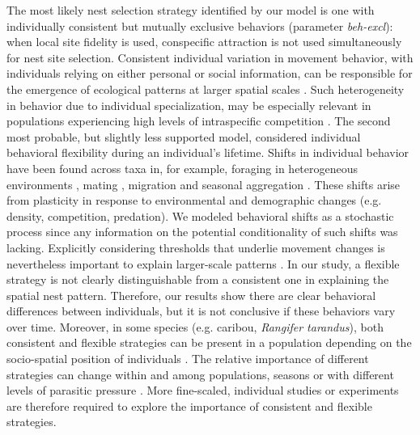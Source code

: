 \documentclass[10pt, twoside]{book} %
\begin{document}
	The most likely nest selection strategy identified by our model is one with individually consistent but mutually exclusive behaviors (parameter \textit{beh-excl}): when local site fidelity is used, conspecific attraction is not used simultaneously for nest site selection. Consistent individual variation in movement behavior, with individuals relying on either personal or social information, can be responsible for the emergence of ecological patterns at larger spatial scales \citep{spiegel2017}. Such heterogeneity in behavior due to individual specialization, may be especially relevant in populations experiencing high levels of intraspecific competition \citep{araujo2011}. The second most probable, but slightly less supported model, considered individual behavioral flexibility during an individual's lifetime. Shifts in individual behavior have been found across taxa in, for example, foraging in heterogeneous environments \citep{newlands2004, webber2020}, mating \citep{perrill1982}, migration \citep{eggeman2016} and seasonal aggregation \citep{bonar2020}. These shifts arise from plasticity in response to environmental and demographic changes (e.g. density, competition, predation). We modeled behavioral shifts as a stochastic process since any information on the potential conditionality of such shifts was lacking. Explicitly considering thresholds that underlie movement changes is nevertheless important to explain larger-scale patterns \citep{morales2002, newlands2004, goossens2020}. In our study, a flexible strategy is not clearly distinguishable from a consistent one in explaining the spatial nest pattern. Therefore, our results show there are clear behavioral differences between individuals, but it is not conclusive if these behaviors vary over time. Moreover, in some species (e.g. caribou, \textit{Rangifer tarandus}), both consistent and flexible strategies can be present in a population depending on the socio-spatial position of individuals \citep{bonar2020}. The relative importance of different strategies can change within and among populations, seasons or with different levels of parasitic pressure \citep{spiegel2017}. More fine-scaled, individual studies or experiments are therefore required to explore the importance of consistent and flexible strategies.\\
	
\end{document}
